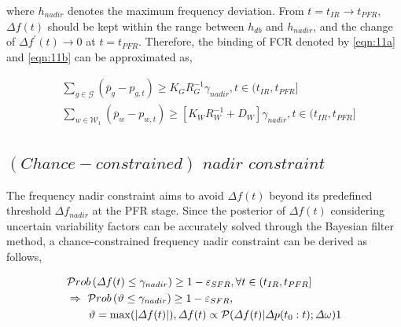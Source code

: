 \documentclass[lettersize,journal]{IEEEtran}
\begin{document}
\noindent where \(h_{nadir}\) denotes the maximum frequency deviation. From \(t \!=\! t_{IR}\!\rightarrow\! t_{PFR}\), \(\varDelta f(t)\) should be kept within the range between \(h_{db}\) and \(h_{nadir}\), and the change of \(\varDelta f^{'}(t)\! \rightarrow\! 0\) at \(t=t_{PFR}\). Therefore, the binding of FCR denoted by \eqref{eqn:11a} and \eqref{eqn:11b} can be approximated as,

\vspace{-0.125in}
\begin{newsubequations}
	\label{eqn:12}
	\begin{align}
		 & \sum\nolimits_{g\in\mathcal{G}} \left( \overline{p}_{g} -p_{g, t}\right) \geq{K_{G} }{ R_{G}^{-1}} \gamma_{nadir}, t \in (t_{IR}, t_{PFR}] \label {eqn:12a} \\
		 & \sum\nolimits_{w\in\mathcal{W}_{1}} \left( \overline{p}_{w} - p_{w, t} \right) \geq [K_{W}R_{W}^{-1} + D_{W}] \gamma_{nadir}, t \in (t_{IR}, t_{PFR}] \label{eqn:12b}
	\end{align}
\end{newsubequations}

\vspace{-0.2in} 
\subsection{$(Chance-constrained)\,\, nadir \,\,constraint$}


The frequency nadir constraint aims to avoid \(\varDelta f(t)\)  beyond its predefined threshold \(\varDelta f_{nadir}\) at the PFR stage.  Since the posterior of \(\varDelta f(t)\) considering
uncertain variability factors can be accurately solved through the Bayesian filter method, a chance-constrained frequency nadir constraint can be derived as follows,

\vspace{-0.125in} 
\begin{small} 
	\begin{align}\label{eqn:13}
	& \mathcal{P}rob\left(\varDelta f(t) \leq \gamma_{nadir}\right) \geq 1-\varepsilon_{SFR},\forall t\in(t_{IR}, t_{PFR}] \notag \\
	& \Rightarrow \,\,\mathcal{P}rob\left(\vartheta \leq \gamma_{nadir}\right) \geq 1-\varepsilon_{SFR},\notag\\
	& \qquad \vartheta = \max ( |\varDelta f(t)| ),\varDelta f(t) \propto \mathcal{P}(\varDelta f(t)|\varDelta p(t_0:t); \varDelta \omega) 
1\end{align} \end{small}
\end{document}

